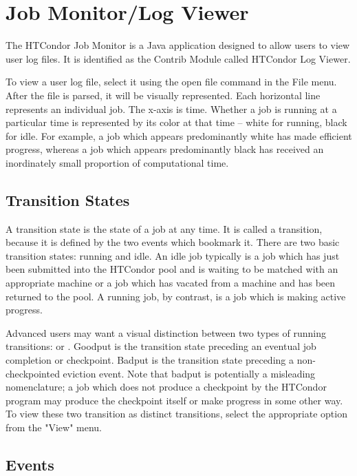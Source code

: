 \section{Job Monitor/Log Viewer}

The HTCondor Job Monitor is a Java application designed to allow users to 
view user log files. 
It is identified as the Contrib Module called HTCondor Log Viewer. 

To view a user log file, select it using the open file command in 
the File menu.  
After the file is parsed, it will be visually represented.  
Each horizontal line represents an individual job.  
The x-axis is time.  
Whether a job is running at a particular time is represented by 
its color at that time -- white for running, black for idle.  
For example, a job which appears predominantly white has made
efficient progress, 
whereas a job which appears predominantly black has received 
an inordinately small proportion of computational time. 


\subsection{\label{sec:transition-states}Transition States}

A transition state is the state of a job at any time.  
It is called a transition, 
because it is defined by the two events which bookmark it.  
There are two basic transition states: running and idle. 
An idle job typically is a job which has just been submitted into 
the HTCondor pool and is waiting to be matched with an appropriate machine 
or a job which has vacated from a machine and has been returned to the pool.  
A running job, by contrast, is a job which is making active progress. 

Advanced users may want a visual distinction between two types of 
running transitions:  or .  
Goodput is the transition state preceding an eventual job completion or
checkpoint.  
Badput is the transition state preceding a non-checkpointed eviction event.
Note that badput is potentially a misleading nomenclature; 
a job which does not produce a checkpoint by the
HTCondor program may produce the checkpoint itself or make progress 
in some other way.  
To view these two transition as distinct transitions, 
select the appropriate option from the "View" menu. 


\subsection{\label{sec:events}Events}

